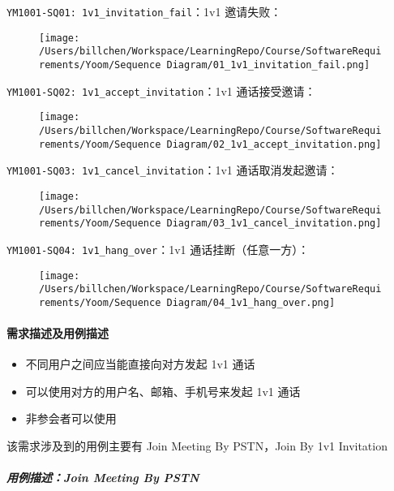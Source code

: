 \documentclass[]{ctexart}
\let\oldparagraph\paragraph
\renewcommand{\paragraph}[1]{\oldparagraph{#1}\mbox{}}
\let\oldsubparagraph\subparagraph
\renewcommand{\subparagraph}[1]{\oldsubparagraph{#1}\mbox{}}
\begin{document}
\texttt{YM1001-SQ01:\ 1v1\_invitation\_fail}：1v1 邀请失败：

\begin{figure}
\centering
\texttt{[image: /Users/billchen/Workspace/LearningRepo/Course/SoftwareRequirements/Yoom/Sequence Diagram/01\_1v1\_invitation\_fail.png]}
\caption{}
\end{figure}

\texttt{YM1001-SQ02:\ 1v1\_accept\_invitation}：1v1 通话接受邀请：

\begin{figure}
\centering
\texttt{[image: /Users/billchen/Workspace/LearningRepo/Course/SoftwareRequirements/Yoom/Sequence Diagram/02\_1v1\_accept\_invitation.png]}
\caption{}
\end{figure}

\texttt{YM1001-SQ03:\ 1v1\_cancel\_invitation}：1v1 通话取消发起邀请：

\begin{figure}
\centering
\texttt{[image: /Users/billchen/Workspace/LearningRepo/Course/SoftwareRequirements/Yoom/Sequence Diagram/03\_1v1\_cancel\_invitation.png]}
\caption{}
\end{figure}

\texttt{YM1001-SQ04:\ 1v1\_hang\_over}：1v1 通话挂断（任意一方）：

\begin{figure}
\centering
\texttt{[image: /Users/billchen/Workspace/LearningRepo/Course/SoftwareRequirements/Yoom/Sequence Diagram/04\_1v1\_hang\_over.png]}
\caption{}
\end{figure}

\hypertarget{ux9700ux6c42ux63cfux8ff0ux53caux7528ux4f8bux63cfux8ff0-1}{%
\paragraph{需求描述及用例描述}\label{ux9700ux6c42ux63cfux8ff0ux53caux7528ux4f8bux63cfux8ff0-1}}

\begin{itemize}
\item
  不同用户之间应当能直接向对方发起 1v1 通话
\item
  可以使用对方的用户名、邮箱、手机号来发起 1v1 通话
\item
  非参会者可以使用
\end{itemize}

该需求涉及到的用例主要有 Join Meeting By PSTN，Join By 1v1 Invitation

\hypertarget{ux7528ux4f8bux63cfux8ff0join-meeting-by-pstn}{%
\subparagraph{用例描述：Join Meeting By
PSTN}\label{ux7528ux4f8bux63cfux8ff0join-meeting-by-pstn}}
\end{document}
